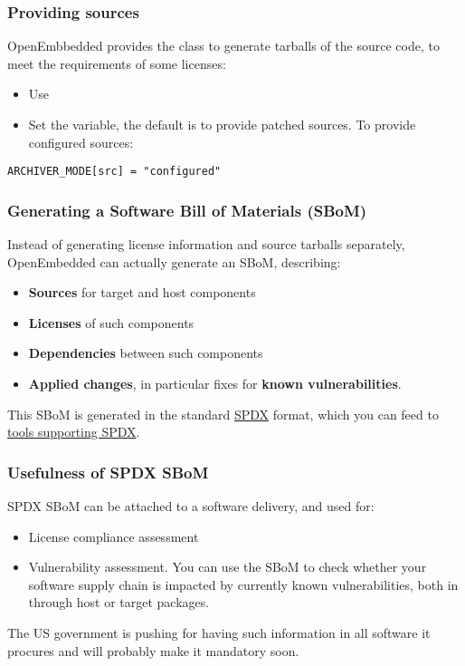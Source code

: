 \begin{frame}[fragile]
  \frametitle{Providing sources}
  OpenEmbbedded provides the  class to generate
  tarballs of the source code, to meet the requirements of some licenses:
  \begin{itemize}
  \item Use 
  \item Set the  variable, the default is to
    provide patched sources. To provide configured sources:
  \end{itemize}
    \begin{block}{}
      \fontsize{9}{9}\selectfont
      \begin{verbatim}
ARCHIVER_MODE[src] = "configured"
      \end{verbatim}
    \end{block}
\end{frame}

\begin{frame}
  \frametitle{Generating a Software Bill of Materials (SBoM)}
  Instead of generating license information and source tarballs separately,
  OpenEmbedded can actually generate an SBoM, describing:
  \begin{itemize}
    \item {\bf Sources} for target and host components
    \item {\bf Licenses} of such components
    \item {\bf Dependencies} between such components
    \item {\bf Applied changes}, in particular fixes for {\bf known vulnerabilities}.
  \end{itemize}
  This SBoM is generated in the standard \href{https://spdx.dev/}{SPDX} format,
  which you can feed to \href{https://spdx.dev/resources/tools/}{tools supporting SPDX}.
\end{frame}

\begin{frame}
  \frametitle{Usefulness of SPDX SBoM}
  SPDX SBoM can be attached to a software delivery, and used for:
  \begin{itemize}
     \item License compliance assessment
     \item Vulnerability assessment. You can use the SBoM to check
	   whether your software supply chain is impacted by currently known
	   vulnerabilities, both in through host or target packages.
  \end{itemize}
  The US government is pushing for having such information
  in all software it procures and will probably make it mandatory soon.
\end{frame}

